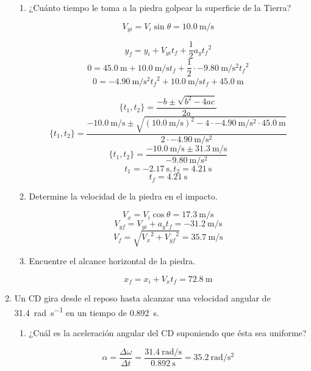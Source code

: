 \documentclass[../practica.root.tex]{subfiles}
\begin{document}
\begin{enumerate}
	      \begin{enumerate}
		      \item ¿Cuánto tiempo le toma a la piedra golpear la superficie de la Tierra?

		            \[V_{yi}=V_i\sin{\theta}=\SI{10,0}{\meter\per\second}\]

		            \[y_f=y_i+V_{yi}t_f+\frac{1}{2}a_y{t_f}^2\]
		            \[0=\SI{45,0}{\meter}+\SI{10,0}{\meter\per\second}t_f+\frac{1}{2}\cdot\SI{-9,80}{\meter\per\second\squared}{t_f}^2\]
		            \[0=\SI{-4,90}{\meter\per\second\squared}{t_f}^2+\SI{10,0}{\meter\per\second}t_f+\SI{45,0}{\meter}\]

		            \[\{t_1,t_2\}=\frac{-b\pm\sqrt{b^2-4ac}}{2a}\]
		            \[\{t_1,t_2\}=\frac{\SI{-10,0}{\meter\per\second}\pm\sqrt{(\SI{10,0}{\meter\per\second})^2-4\cdot\SI{-4,90}{\meter\per\second\squared}\cdot\SI{45,0}{\meter}}}{2\cdot\SI{-4,90}{\meter\per\second\squared}}\]
		            \[\{t_1,t_2\}=\frac{\SI{-10,0}{\meter\per\second}\pm\SI{31,3}{\meter\per\second}}{\SI{-9,80}{\meter\per\second\squared}}\]
		            \[t_1=\SI{-2,17}{\second}, t_2=\SI{4,21}{\second}\]
		            \[t_f=\boxed{\SI{4,21}{\second}}\]

		      \item Determine la velocidad de la piedra en el impacto.

		            \[V_x=V_i\cos{\theta}=\SI{17,3}{\meter\per\second}\]
		            \[V_{yf}=V_{yi}+a_yt_f=\SI{-31,2}{\meter\per\second}\]
		            \[V_f=\sqrt{{V_x}^2+{V_{yf}}^2}=\boxed{\SI{35,7}{\meter\per\second}}\]

		      \item Encuentre el alcance horizontal de la piedra.

		            \[x_f=x_i+V_xt_f=\boxed{\SI{72,8}{\meter}}\]
	      \end{enumerate}

	\item Un CD gira desde el reposo hasta alcanzar una velocidad angular de \SI{31,4}{\radian\per\second} en un tiempo de \SI{0,892}{\second}.

	      \begin{enumerate}
		      \item ¿Cuál es la aceleración angular del CD suponiendo que ésta sea uniforme?

		            \[\alpha=\frac{\Delta\omega}{\Delta t}=\frac{\SI{31,4}{\radian\per\second}}{\SI{0,892}{\second}}=\boxed{\SI{35,2}{\radian\per\second\squared}}\]


\end{enumerate}
\end{enumerate}
\end{document}
